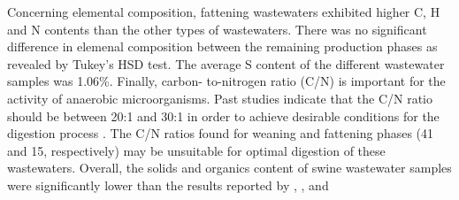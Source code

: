 Concerning elemental composition, fattening wastewaters exhibited higher C, H and N contents than the other types of wastewaters. There was no significant difference in elemenal composition between the remaining production phases as revealed by Tukey's HSD test. The average S content of the different wastewater samples was 1.06\%. Finally, carbon- to-nitrogen ratio (C/N) is important for the activity of anaerobic microorganisms. Past studies indicate that the C/N ratio should be between 20:1 and 30:1 in order to achieve desirable conditions for the digestion process \cite{1,Fricke_2007}. The C/N ratios found for weaning and fattening phases (41 and 15, respectively) may be unsuitable for optimal digestion of these wastewaters. Overall, the solids and organics content of swine wastewater samples were significantly lower than the results reported by \cite{Mart_nez_Suller_2008}, \cite{Moral_2005}, and  \cite{Moral_2008}